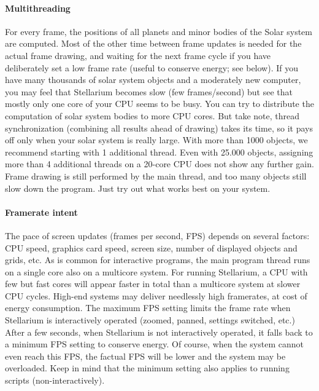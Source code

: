 \paragraph{Multithreading} \label{sec:gui:configuration:tools:threads} 
For every frame, the positions of all planets and minor bodies of the Solar system are computed. 
Most of the other time between frame updates is needed for the actual frame drawing, 
and waiting for the next frame cycle if you have deliberately set a low frame rate (useful to conserve energy; see below). 
If you have many thousands of solar system objects and a moderately new computer, 
you may feel that Stellarium becomes slow (few frames/second) but see that mostly only one core of your CPU seems to be busy.  
You can try to distribute the computation of solar system bodies to more CPU cores. 
But take note, thread synchronization (combining all results ahead of drawing) takes its time, 
so it pays off only when your solar system is really large. 
With more than 1000 objects, we recommend starting with 1 additional thread. 
Even with 25.000 objects, assigning more than 4 additional threads on a 20-core CPU does not show any further gain. 
Frame drawing is still performed by the main thread, and too many objects still slow down the program. 
Just try out what works best on your system.

\paragraph{Framerate intent} \label{sec:gui:configuration:tools:fps} The pace of screen updates (frames per second, FPS) depends on several factors: 
CPU speed, graphics card speed, screen size, number of displayed objects and grids, etc. 
As is common for interactive programs, the main program thread runs on a single core also on a multicore system. 
For running Stellarium, a CPU with few but fast cores will appear faster in total than a multicore system at slower CPU cycles.  
High-end systems may deliver needlessly high framerates, at cost of energy consumption.
The maximum FPS setting limits the frame rate when Stellarium is interactively operated 
(zoomed, panned, settings switched, etc.) 
After a few seconds, when Stellarium is not interactively operated, it falls back to a minimum FPS setting to conserve energy. 
Of course, when the system cannot even reach this FPS, the factual FPS will be lower and the system may be overloaded.
Keep in mind that the minimum setting also applies to running scripts (non-interactively).


